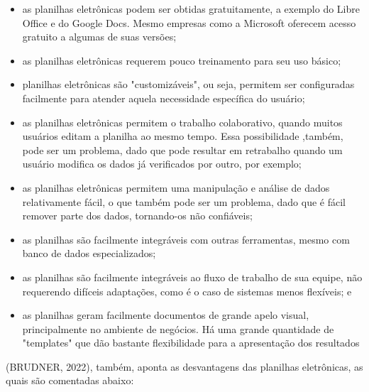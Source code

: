 \begin{itemize}
\item as planilhas eletrônicas podem ser obtidas gratuitamente, a exemplo do Libre Office e do Google Docs. Mesmo empresas como a Microsoft oferecem acesso gratuito a algumas de suas versões;
\item as planilhas eletrônicas requerem pouco treinamento para seu uso básico;
\item planilhas eletrônicas são "customizáveis", ou seja, permitem ser configuradas facilmente para atender aquela necessidade específica do usuário;
\item as planilhas eletrônicas permitem o trabalho colaborativo, quando muitos usuários editam a planilha ao mesmo tempo. Essa possibilidade ,também, pode ser um problema, dado que pode resultar em retrabalho quando um usuário modifica os dados já verificados por outro, por exemplo;
\item as planilhas eletrônicas permitem uma manipulação e análise de dados relativamente fácil, o que também pode ser um problema, dado que é fácil remover parte dos dados, tornando-os não confiáveis;
\item as planilhas são facilmente integráveis com outras ferramentas, mesmo com banco de dados especializados;
\item as planilhas são facilmente integráveis ao fluxo de trabalho de sua equipe, não requerendo difíceis adaptações, como é o caso de sistemas menos flexíveis; e
\item as planilhas geram facilmente documentos de grande apelo visual, principalmente no ambiente de negócios. Há uma grande quantidade de "templates" que dão bastante flexibilidade para a apresentação dos resultados
\end{itemize}

(BRUDNER, 2022), também, aponta as desvantagens das planilhas eletrônicas, as quais são comentadas abaixo:


